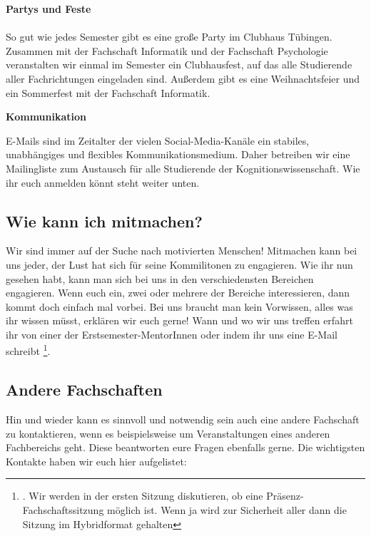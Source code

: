 \pagebreak

\textbf{Partys und Feste}
\\ \corona \\
So gut wie jedes Semester gibt es eine große Party im Clubhaus Tübingen. Zusammen mit der Fachschaft Informatik und der Fachschaft Psychologie veranstalten wir einmal im Semester ein Clubhausfest, auf das alle Studierende aller Fachrichtungen eingeladen sind. Außerdem gibt es eine Weihnachtsfeier und ein Sommerfest mit der Fachschaft Informatik.

\textbf{Kommunikation}

E-Mails sind im Zeitalter der vielen Social-Media-Kanäle ein stabiles, unabhängiges und flexibles Kommunikationsmedium. Daher betreiben wir eine Mailingliste zum Austausch für alle Studierende der Kognitionswissenschaft. Wie ihr euch anmelden könnt steht weiter unten. \\

\subsection{Wie kann ich mitmachen?}
Wir sind immer auf der Suche nach motivierten Menschen! Mitmachen kann bei uns jeder, der Lust hat sich für seine Kommilitonen zu engagieren. Wie ihr nun gesehen habt, kann man sich bei uns in den verschiedensten Bereichen engagieren. Wenn euch ein, zwei oder mehrere der Bereiche interessieren, dann kommt doch einfach mal vorbei. Bei uns braucht man kein Vorwissen, alles was ihr wissen müsst, erklären wir euch gerne!
Wann und wo wir uns treffen erfahrt ihr von einer der Erstsemester-MentorInnen oder indem ihr uns eine E-Mail schreibt \footnote{. Wir werden in der ersten Sitzung diskutieren, ob eine Präsenz-Fachschaftssitzung möglich ist. Wenn ja wird zur Sicherheit aller dann die Sitzung im Hybridformat gehalten}.

\vfill
\subsection{Andere Fachschaften}
Hin und wieder kann es sinnvoll und notwendig sein auch eine andere Fachschaft zu kontaktieren, wenn es beispielsweise um Veranstaltungen eines anderen Fachbereichs geht. Diese beantworten eure Fragen ebenfalls gerne. Die wichtigsten Kontakte haben wir euch hier aufgelistet:

